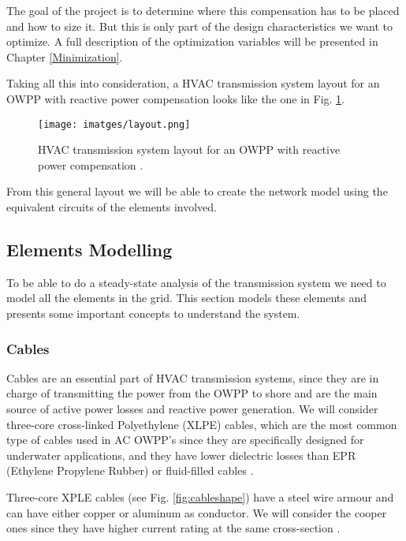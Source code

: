 \documentclass[a4paper,11pt, titlepage, twoside]{article}
\begin{document}
The goal of the project is to determine where this compensation has to be placed  and how to size it. But this is only part of the design characteristics we want to optimize. A full description of the optimization variables will be
presented in Chapter \ref{Minimization}.

Taking all this into consideration, a HVAC transmission system layout for an OWPP with reactive power compensation looks like the one in Fig. \ref{fig:fulltransmission}.
\begin{figure}[H] %
    \centering
    \texttt{[image: imatges/layout.png]}
    \caption{HVAC transmission system layout for an OWPP with reactive power compensation \cite{paperbase}.}
    \label{fig:fulltransmission} %
\end{figure}

From this general layout we will be able to create the network model using the equivalent circuits of the  elements involved.

\subsection{Elements Modelling}\label{elementsmodelling}

To be able to do a steady-state analysis of the transmission system we need to model all the elements in the grid. This section models these elements and presents
some important concepts to understand the system.




\subsubsection{Cables}

Cables are an essential part of HVAC transmission systems, since they are in charge of transmitting the power from the OWPP to
shore and are the main source of active power losses and reactive power generation. We will consider  three-core cross-linked Polyethylene (XLPE) cables, which are the most common type of cables used in  AC OWPP's since they are
specifically designed for underwater applications, and they have lower dielectric losses than EPR (Ethylene Propylene Rubber) or fluid-filled cables \cite{ABB2}.  \par

Three-core XPLE cables (see Fig. \ref{fig:cableshape}) have a steel wire armour and can have either copper or aluminum as conductor. We will consider the cooper ones since they have higher current rating at the same cross-section \cite{ABB}. 
\end{document}
